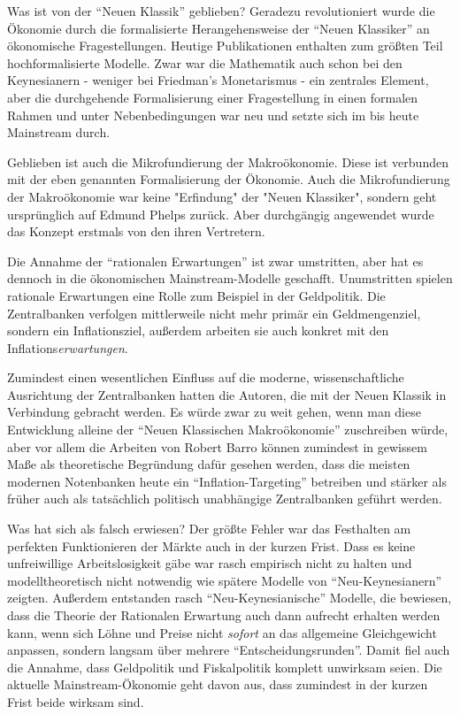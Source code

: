 Was ist von der "`Neuen Klassik"' geblieben? Geradezu revolutioniert wurde die Ökonomie durch die formalisierte Herangehensweise der "`Neuen Klassiker"' an ökonomische Fragestellungen. Heutige Publikationen enthalten zum größten Teil hochformalisierte Modelle. Zwar war die Mathematik auch schon bei den Keynesianern - weniger bei Friedman's Monetarismus - ein zentrales Element, aber die durchgehende Formalisierung einer Fragestellung in einen formalen Rahmen und unter Nebenbedingungen war neu und setzte sich im bis heute Mainstream durch.

Geblieben ist auch die Mikrofundierung der Makroökonomie. Diese ist verbunden mit der eben genannten Formalisierung der Ökonomie. Auch die Mikrofundierung der Makroökonomie war keine "Erfindung" der "Neuen Klassiker", sondern geht ursprünglich auf Edmund Phelps zurück. Aber durchgängig angewendet wurde das Konzept erstmals von den ihren Vertretern.

Die Annahme der "`rationalen Erwartungen"' ist zwar umstritten, aber hat es dennoch in die ökonomischen Mainstream-Modelle geschafft. Unumstritten spielen rationale Erwartungen eine Rolle zum Beispiel in der Geldpolitik. Die Zentralbanken verfolgen mittlerweile nicht mehr primär ein Geldmengenziel, sondern ein Inflationsziel, außerdem arbeiten sie auch konkret mit den Inflations\textit{erwartungen}.

Zumindest einen wesentlichen Einfluss auf die moderne, wissenschaftliche Ausrichtung der Zentralbanken hatten die Autoren, die mit der Neuen Klassik in Verbindung gebracht werden. Es würde zwar zu weit gehen, wenn man diese Entwicklung alleine der "`Neuen Klassischen Makroökonomie"' zuschreiben würde, aber vor allem die Arbeiten von Robert Barro können zumindest in gewissem Maße als theoretische Begründung dafür gesehen werden, dass die meisten modernen Notenbanken heute ein "`Inflation-Targeting"' betreiben und stärker als früher auch als tatsächlich politisch unabhängige Zentralbanken geführt werden.


Was hat sich als falsch erwiesen? Der größte Fehler war das Festhalten am perfekten Funktionieren der Märkte auch in der kurzen Frist. Dass es keine unfreiwillige Arbeitslosigkeit gäbe war rasch empirisch nicht zu halten und modelltheoretisch nicht notwendig wie spätere Modelle von "`Neu-Keynesianern"' zeigten. Außerdem entstanden rasch "`Neu-Keynesianische"' Modelle, die bewiesen, dass die Theorie der Rationalen Erwartung auch dann aufrecht erhalten werden kann, wenn sich Löhne und Preise nicht \textit{sofort} an das allgemeine Gleichgewicht anpassen, sondern langsam über mehrere "`Entscheidungsrunden"'. Damit fiel auch die Annahme, dass Geldpolitik und Fiskalpolitik komplett unwirksam seien. Die aktuelle Mainstream-Ökonomie geht davon aus, dass zumindest in der kurzen Frist beide wirksam sind.

